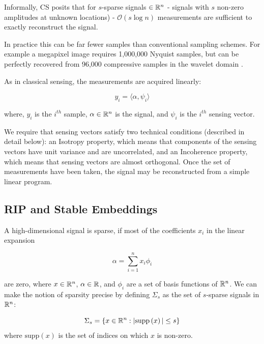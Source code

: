 \documentclass[12pt]{report}
\begin{document}
Informally, CS posits that for \(s\)-sparse signals \(\in {\mathbb{R}}^{n}\) - signals with \(s\) non-zero amplitudes at unknown locations) - \(\mathcal{O}(s\log{n})\) measurements are sufficient to exactly reconstruct the signal.

In practice this can be far fewer samples than conventional sampling schemes. For example a megapixel image requires 1,000,000 Nyquist samples, but can be perfectly recovered from 96,000 compressive samples in the wavelet domain \cite{watkincandes}. 

As in classical sensing, the measurements are acquired linearly:

\begin{equation}
y_i = \langle \alpha, \psi_i \rangle
\end{equation}

where, \(y_i\) is the \(i^{th}\) sample, \(\alpha \in {\mathbb{R}}^n\) is the signal, and \(\psi_i\) is the \(i^{th}\) sensing vector.

We require that sensing vectors satisfy two technical conditions (described in detail below): an Isotropy property, which means that components of the sensing vectors have unit variance and are uncorrelated, and an Incoherence property, which means that sensing vectors are almost orthogonal. Once the set of measurements have been taken, the signal may be reconstructed from a simple linear program.

\subsection{RIP and Stable Embeddings}

A high-dimensional signal is sparse, if most of the coefficients \(x_i\) in the linear expansion 

\begin{equation}
\alpha = \sum	_{i=1}^{n} x_i \phi_i
\end{equation}

are zero, where \(x \in {\mathbb{R}}^n\), \(\alpha \in {\mathbb{R}}\), and \(\phi_i\) are a set of basis functions of \({\mathbb{R}}^n\). We can make the notion of sparsity precise by defining \(\Sigma_s\) as the set of \(s\)-sparse signals in \({\mathbb{R}}^n\):

\begin{definition}
\begin{equation}
\Sigma_s = \{ x \in {\mathbb{R}}^n : |\mathrm{supp} \left(x\right) |\leq s\}
\end{equation}
where \(\mathrm{supp}\left(x\right) \) is the set of indices on which \(x\) is non-zero.
\end{definition}
\end{document}
